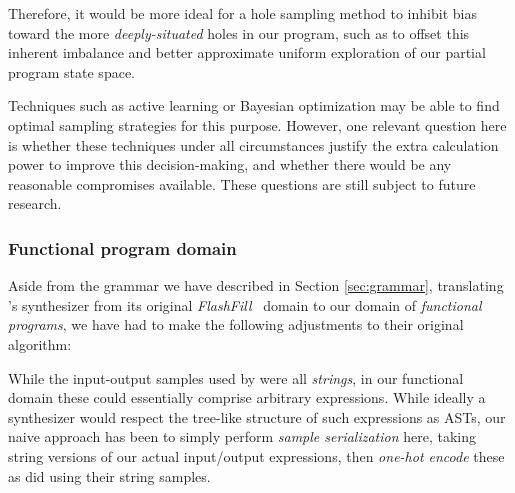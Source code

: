 \documentclass{article}
\begin{document}
Therefore, it would be more ideal for a hole sampling method to inhibit
bias toward the more \emph{deeply-situated} holes in our program,
such as to offset this inherent imbalance and better approximate
uniform exploration of our partial program state space.

Techniques such as active learning or Bayesian optimization may be able to find optimal sampling strategies for this purpose.
However, one relevant question here is whether these techniques under all circumstances justify the extra calculation power to improve this decision-making,
and whether there would be any reasonable compromises available.
These questions are still subject to future research.


\subsubsection{Functional program domain} \label{sec:fp}

Aside from the grammar we have described in Section \ref{sec:grammar},
translating \citet{nsps}'s synthesizer from its original \emph{FlashFill}~\citep{prose} domain to our domain of \emph{functional programs},
we have had to make the following adjustments to their original algorithm:

    While the input-output samples used by \citet{nsps} were all \emph{strings},
    in our functional domain these could essentially comprise arbitrary expressions.
    While ideally a synthesizer would respect the tree-like structure of such expressions as ASTs,
    our naive approach has been to simply perform \emph{sample serialization} here,
    taking string versions of our actual input/output expressions,
    then \emph{one-hot encode} these as \citet{nsps} did using their string samples.
\end{document}
